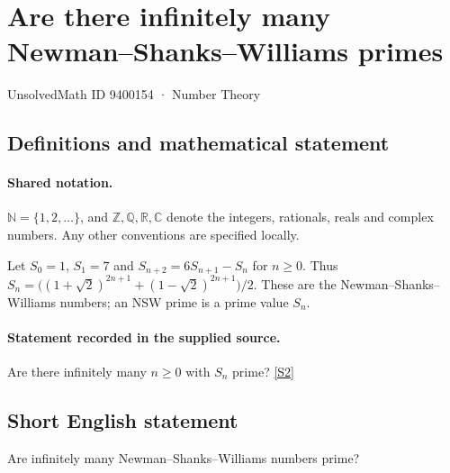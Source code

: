 \documentclass[11pt]{article}
\newcommand{\sref}[2]{\hyperlink{source:#1:#2}{[S#2]}}
\begin{document}
\setcounter{section}{9400153}
\section{Are there infinitely many Newman–Shanks–Williams primes}\label{9400154}
{\small\sffamily UnsolvedMath ID 9400154 · Number Theory}
\subsection{Definitions and mathematical statement}

\paragraph{Shared notation.}$\mathbb N=\{1,2,\ldots\}$, and $\mathbb Z,\mathbb Q,\mathbb R,\mathbb C$ denote the integers, rationals, reals and complex numbers. Any other conventions are specified locally.


Let $S_0=1$, $S_1=7$ and $S_{n+2}=6S_{n+1}-S_n$ for $n\ge0$. Thus $S_n=\bigl((1+\sqrt2)^{2n+1}+(1-\sqrt2)^{2n+1}\bigr)/2$. These are the Newman--Shanks--Williams numbers; an NSW prime is a prime value $S_n$.
\paragraph{Statement recorded in the supplied source.}
Are there infinitely many $n\ge0$ with $S_n$ prime? \sref{9400154}{2}
\subsection{Short English statement}
Are infinitely many Newman–Shanks–Williams numbers prime?
\end{document}
